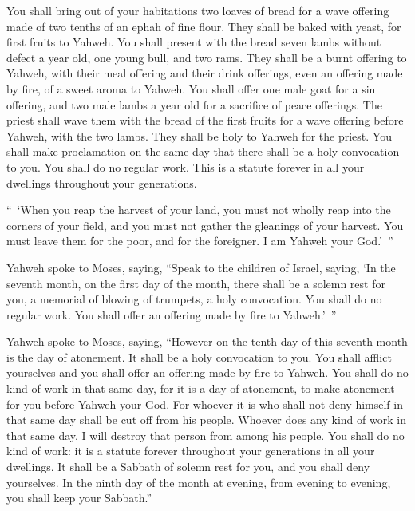 {You shall bring out of your habitations two loaves of bread for a wave offering made of two tenths of an ephah of fine flour. They shall be baked with yeast, for first fruits to Yahweh.
You shall present with the bread seven lambs without defect a year old, one young bull, and two rams. They shall be a burnt offering to Yahweh, with their meal offering and their drink offerings, even an offering made by fire, of a sweet aroma to Yahweh.
You shall offer one male goat for a sin offering, and two male lambs a year old for a sacrifice of peace offerings.
The priest shall wave them with the bread of the first fruits for a wave offering before Yahweh, with the two lambs. They shall be holy to Yahweh for the priest.
You shall make proclamation on the same day that there shall be a holy convocation to you. You shall do no regular work. This is a statute forever in all your dwellings throughout your generations.
\par }{\PP {}“ ‘When you reap the harvest of your land, you must not wholly reap into the corners of your field, and you must not gather the gleanings of your harvest. You must leave them for the poor, and for the foreigner. I am Yahweh your God.’ ”
\par }{\PP {}Yahweh spoke to Moses, saying,
“Speak to the children of Israel, saying, ‘In the seventh month, on the first day of the month, there shall be a solemn rest for you, a memorial of blowing of trumpets, a holy convocation.
You shall do no regular work. You shall offer an offering made by fire to Yahweh.’ ”
\par }{\PP {}Yahweh spoke to Moses, saying,
“However on the tenth day of this seventh month is the day of atonement. It shall be a holy convocation to you. You shall afflict yourselves and you shall offer an offering made by fire to Yahweh.
You shall do no kind of work in that same day, for it is a day of atonement, to make atonement for you before Yahweh your God.
For whoever it is who shall not deny himself in that same day shall be cut off from his people.
Whoever does any kind of work in that same day, I will destroy that person from among his people.
You shall do no kind of work: it is a statute forever throughout your generations in all your dwellings.
It shall be a Sabbath of solemn rest for you, and you shall deny yourselves. In the ninth day of the month at evening, from evening to evening, you shall keep your Sabbath.”
}
